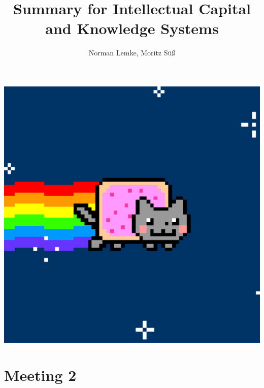 \documentclass[12pt,a4paper]{article}
\author{Norman Lemke, Moritz Süß}
\begin{document}
  \title{Summary for Intellectual Capital and Knowledge Systems}
  \maketitle
  \begin{center}
    \includegraphics[width=16cm]{cover.pdf}
  \end{center}
  \pagebreak
  \tableofcontents
  \thispagestyle{empty}
  \pagebreak

  \section{Meeting 2} %
\end{document}
